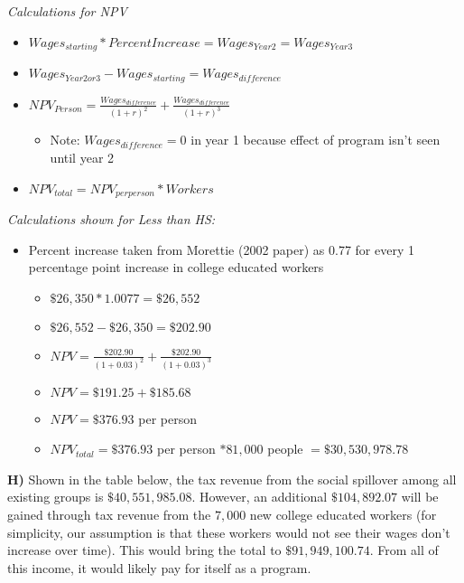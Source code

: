 \documentclass[11pt]{article}
\providecommand{\tightlist}{%
      \setlength{\itemsep}{0pt}\setlength{\parskip}{0pt}}
\begin{document}
\emph{Calculations for NPV}

\begin{itemize}
\item
  \(Wages_{starting} * Percent Increase = Wages_{Year2}= Wages_{Year3}\)
\item
  \(Wages_{Year2or3} - Wages_{starting} = Wages_{difference}\)
\item
  \(NPV_{Person} = \frac{Wages_{difference}}{(1+r)^2}+\frac{Wages_{difference}}{(1+r)^3}\)

  \begin{itemize}
  \tightlist
  \item
    Note: \(Wages_{difference} = 0\) in year 1 because effect of program
    isn't seen until year 2
  \end{itemize}
\item
  \(NPV_{total} = NPV_{per person} * Workers\)
\end{itemize}

\emph{Calculations shown for Less than HS:}

\begin{itemize}
\item
  Percent increase taken from Morettie (2002 paper) as 0.77 for every 1
  percentage point increase in college educated workers

  \begin{itemize}
  \item
    \(\$26,350 * 1.0077 = \$26,552\)
  \item
    \(\$26,552 - \$26,350 = \$202.90\)
  \item
    \(NPV = \frac{\$202.90}{(1+0.03)^2}+\frac{\$202.90}{(1+0.03)^3}\)
  \item
    \(NPV = \$191.25 + \$185.68\)
  \item
    \(NPV = \$376.93\) per person
  \item
    \(NPV_{total} = \$376.93\) per person \(* 81,000\) people
    \(= \$30,530,978.78\)
  \end{itemize}
\end{itemize}

\textbf{H)} Shown in the table below, the tax revenue from the social
spillover among all existing groups is \(\$40,551,985.08\). However, an
additional \(\$104,892.07\) will be gained through tax revenue from the
\(7,000\) new college educated workers (for simplicity, our assumption
is that these workers would not see their wages don't increase over
time). This would bring the total to \(\$91,949,100.74\). From all of
this income, it would likely pay for itself as a program.
\end{document}
